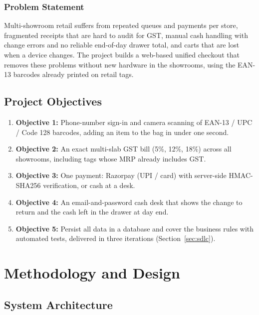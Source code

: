 \documentclass[12pt,letterpaper,twoside,openany]{report}
\begin{document}
\subsection{Problem Statement}
Multi-showroom retail suffers from repeated queues and payments per store, fragmented
receipts that are hard to audit for GST, manual cash handling with change errors and no
reliable end-of-day drawer total, and carts that are lost when a device changes. The project
builds a web-based unified checkout that removes these problems without new hardware in the
showrooms, using the EAN-13 barcodes already printed on retail tags.

\section{Project Objectives}
\begin{enumerate}[leftmargin=*]
  \item \textbf{Objective 1:} Phone-number sign-in and camera scanning of EAN-13 / UPC /
        Code 128 barcodes, adding an item to the bag in under one second.
  \item \textbf{Objective 2:} An exact multi-slab GST bill (5\%, 12\%, 18\%) across all
        showrooms, including tags whose MRP already includes GST.
  \item \textbf{Objective 3:} One payment: Razorpay (UPI / card) with server-side HMAC-SHA256
        verification, or cash at a desk.
  \item \textbf{Objective 4:} An email-and-password cash desk that shows the change to return
        and the cash left in the drawer at day end.
  \item \textbf{Objective 5:} Persist all data in a database and cover the business rules
        with automated tests, delivered in three iterations (Section~\ref{sec:sdlc}).
\end{enumerate}

\chapter{Methodology and Design}

\section{System Architecture}
\end{document}
